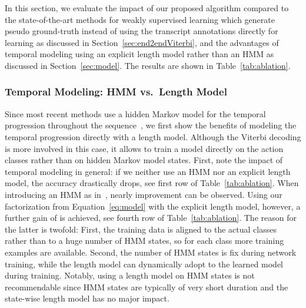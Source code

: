 \documentclass[10pt,twocolumn,letterpaper]{article}
\begin{document}
In this section, we evaluate the impact of our proposed algorithm compared
to the state-of-the-art methods for weakly supervised learning which generate pseudo ground-truth instead of using the transcript annotations directly for learning as discussed in Section~\ref{sec:end2endViterbi}, and the advantages of temporal modeling
using an explicit length model rather than an HMM as discussed in Section~\ref{sec:model}.
The results are shown in Table~\ref{tab:ablation}.

\subsubsection{Temporal Modeling: HMM vs.\ Length Model}
Since most recent methods use a hidden Markov model for the temporal progression throughout
the sequence~\cite{kuehne2017weakly,richard2017weakly,koller2017resign}, we first show the
benefits of modeling the temporal progression directly with a length model. Although the
Viterbi decoding is more involved in this case, it allows to train a model directly on the
action classes rather than on hidden Markov model states.
First, note the impact of temporal modeling in general: if we neither use an HMM nor
an explicit length model, the accuracy drastically drops, see first row of Table~\ref{tab:ablation}.
When introducing an HMM as in~\cite{richard2017weakly}, nearly  improvement can be
observed. Using our factorization from Equation~\eqref{eq:model} with the explicit length
model, however, a further gain of  is achieved, see fourth row of Table~\ref{tab:ablation}.
The reason for the latter is twofold: First, the training data is aligned to the actual classes
rather than to a huge number of HMM states, so for each class more training examples are available.
Second, the number of HMM states is fix during network training, while the length model can
dynamically adopt to the learned model during training. Notably, using a length model on
HMM states is not recommendable since HMM states are typically of very short duration and the
state-wise length model has no major impact.
\end{document}
